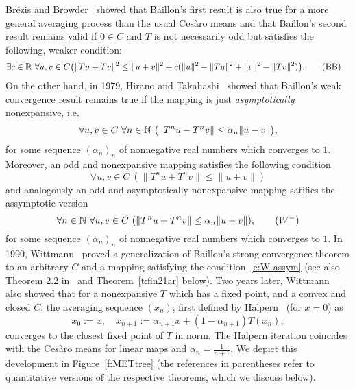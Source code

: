 Br\'ezis and Browder~\cite{Brezis1976} showed that 
Baillon's first result is also true for a more general averaging process than the usual Ces{\`a}ro means
and that
Baillon's second
result remains valid if $0\in C$ and $T$ is not necessarily odd but satisfies the following, weaker condition:
\begin{align*}
\exists c&\in\mathbb{R}\ \forall u,v \in C 
 \big(\|Tu+Tv\|^2\leq\|u+v\|^2+c(\|u\|^2-\|Tu\|^2+\|v\|^2-\|Tv\|^2)\big). \tag{BB}\label{e:BB}
\end{align*}
On the other hand, in 1979, Hirano and Takahashi~\cite{Hirano1979} showed that Baillon's weak convergence result remains true if the mapping is just {\em asymptotically} nonexpansive, i.e. 
\[
\forall u,v\in C\ \forall n\in\mathbb{N}\ \big( \|T^nu-T^nv\|\leq \alpha_n\|u-v\|\big),
\]
for some sequence $(\alpha_n)_n$ of nonnegative real numbers which converges to $1$. 
Moreover, an odd and nonexpansive
mapping satisfies the following condition
\[
\forall u,v\in C\ (\| T^nu + T^nv \| \leq \|u + v\|) \tag{$W$}\label{e:W-intro}
\]
and analogously an odd and asymptotically nonexpansive mapping satifies the assymptotic version
\[
\forall n\in\NN\ \forall u,v\in C\ (\| T^nu + T^nv \| \leq \alpha_n\|u + v\|), \tag{$W^-$}\label{e:W-assym}
\]
for some sequence $(\alpha_n)_n$ of nonnegative real numbers which converges to $1$. In 1990, Wittmann~\cite{Wittmann90}
proved a generalization of Baillon's strong convergence theorem 
to an arbitrary $C$ and a mapping satisfying the condition~\eqref{e:W-assym} (see also Theorem 2.2 in~\cite{Wittmann90} and Theorem~\ref{t:fin21ar} below).
Two years later, Wittmann~\cite{Wittmann92} also showed that for a nonexpansive $T$ which has a fixed point, and a convex and closed $C$, the averaging sequence $(x_n)$, first defined by Halpern~\cite{Halpern1967} (for $x=0$) as
\[
x_0:=x,\quad x_{n+1}:=\alpha_{n+1}x+(1-\alpha_{n+1})T(x_n),
\] converges to the closest fixed point of $T$ in norm. The Halpern iteration coincides
with the Ces{\`a}ro means for linear maps and $\alpha_n=\frac{1}{n+1}$.
We depict this development in Figure~\ref{f:METtree} (the references in parentheses refer to
quantitative versions of the respective theorems, which we discuss below).
